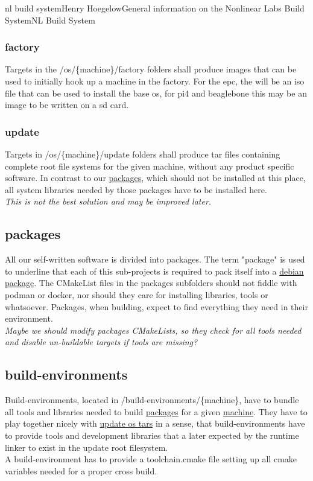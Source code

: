 \documentclass[11pt]{article}
\begin{document}
\begin{Name}{1}{nl build system}{Henry Hoegelow}{General information on the Nonlinear Labs Build System}{NL Build System}
\subsubsection{factory}
Targets in the /os/\{machine\}/factory folders shall produce images that can be used to initially hook up a machine in the factory. For the epc, the will be an iso file that can be used to install the base os, for pi4 and beaglebone this may be an image to be written on a sd card.

\subsubsection{update} \label{os-update}
Targets in /os/\{machine\}/update folders shall produce tar files containing complete root file systems for the given machine, without any product specific software. In contrast to our \hyperref[packages]{packages}, which should not be installed at this place, all system libraries needed by those packages have to be installed here.\\
\emph{This is not the best solution and may be improved later.}

\subsection{packages} \label{packages}
All our self-written software is divided into packages. The term "package" is used to underline that each of this sub-projects is required to pack itself into a \hyperref[cmake-package]{debian package}. The CMakeList files in the packages subfolders should not fiddle with podman or docker, nor should they care for installing libraries, tools or whatsoever. Packages, when building, expect to find everything they need in their environment.\\
\emph{Maybe we should modify packages CMakeLists, so they check for all tools needed and disable un-buildable targets if tools are missing?}

\subsection{build-environments} \label{buildenv}
Build-environments, located in /build-environments/\{machine\}, have to bundle all tools and libraries needed to build \hyperref[packages]{packages} for a given \hyperref[machine]{machine}. They have to play together nicely with \hyperref[os-update]{update os tars} in a sense, that build-environments have to provide tools and development libraries that a later expected by the runtime linker to exist in the update root filesystem.\\
A build-environment has to provide a toolchain.cmake file setting up all cmake variables needed for a proper cross build.


\end{Name}
\end{document}
